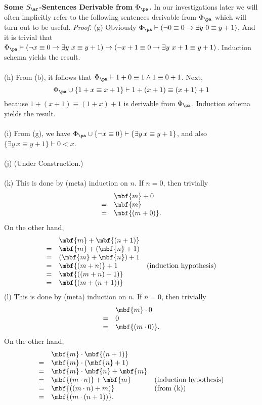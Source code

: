 \textbf{Some $S_\ar$-Sentences Derivable from $\Phi_\pa$.} In our investigations later we will often implicitly refer to the following sentences derivable from $\Phi_\pa$ which will turn out to be useful.
\textit{Proof.}
(g) Obviously $\Phi_\pa \vdash (\neg 0 \equiv 0 \rightarrow \exists y \ 0 \equiv y + 1)$. And it is trivial that $\Phi_\pa \vdash (\neg x \equiv 0 \rightarrow \exists y \ x \equiv y + 1) \rightarrow (\neg x + 1 \equiv 0 \rightarrow \exists y \ x + 1 \equiv y + 1)$. Induction schema yields the result.\\
\ \\
(h) From (b), it follows that $\Phi_\pa \vdash 1 + 0 \equiv 1 \land 1 \equiv 0 + 1$. Next,
\[
\Phi_\pa \cup \{ 1 + x \equiv x + 1 \} \vdash 1 + (x + 1) \equiv (x + 1) + 1
\]
because $1 + (x + 1) \equiv (1 + x) + 1$ is derivable from $\Phi_\pa$. Induction schema yields the result.\\
\ \\
(i) From (g), we have $\Phi_\pa \cup \{ \neg x \equiv 0 \} \vdash \{ \exists y \, x \equiv y + 1 \}$, and also $\{ \exists y \, x \equiv y + 1 \} \vdash 0 < x$.\\
\ \\
(j) (Under Construction.)\\
\ \\
(k) This is done by (meta) induction on $n$. If $n = 0$, then trivially
\[
\begin{array}{ll}
\ & \mbf{m} + 0 \cr
= & \mbf{m}\cr
= & \mbf{(m + 0)}.
\end{array}
\]
On the other hand,
\[
\begin{array}{lll}
\ & \mbf{m} + \mbf{(n + 1)} & \ \cr
= & \mbf{m} + (\mbf{n} + 1) & \ \cr
= & (\mbf{m} + \mbf{n}) + 1 & \ \cr
= & \mbf{(m + n)} + 1 & \mbox{(induction hypothesis)}\cr
= & \mbf{((m + n) + 1)} & \ \cr
= & \mbf{(m + (n + 1))} & \ 
\end{array}
\]
(l) This is done by (meta) induction on $n$. If $n = 0$, then trivially
\[
\begin{array}{ll}
\ & \mbf{m} \cdot 0 \cr
= & 0 \cr
= & \mbf{(m \cdot 0)}.
\end{array}
\]
On the other hand,
\[
\begin{array}{lll}
\ & \mbf{m} \cdot \mbf{(n + 1)} & \ \cr
= & \mbf{m} \cdot (\mbf{n} + 1) & \ \cr
= & \mbf{m} \cdot \mbf{n} + \mbf{m} & \ \cr
= & \mbf{(m \cdot n)} + \mbf{m} & \mbox{(induction hypothesis)} \cr
= & \mbf{((m \cdot n) + m)} & \mbox{(from (k))} \cr
= & \mbf{(m \cdot (n + 1))}. & \ 
\end{array}
\]
